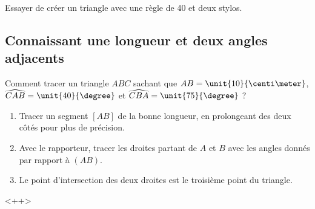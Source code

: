 \begin{example}
    Essayer de créer un triangle avec une règle de \unit{40}{\centi\meter} et deux stylos.
\end{example}

\subsection{Connaissant une longueur et deux angles adjacents}



\vspace{2cm}

Comment tracer un triangle \( ABC\) sachant que \( AB=\unit{10}{\centi\meter}\), \( \widehat{CAB}=\unit{40}{\degree}\) et \( \widehat{CBA}=\unit{75}{\degree}\) ?



\begin{enumerate}
    \item
        Tracer un segment $[AB]$ de la bonne longueur, en prolongeant des deux côtés pour plus de précision.

\begin{center}
   
\end{center}
\item
    Avec le rapporteur, tracer les droites partant de \( A\) et \( B\) avec les angles donnés par rapport à \( (AB)\).

\begin{center}
   
\end{center}

\item

    Le point d'intersection des deux droites est le troisième point du triangle.

\begin{center}
   
\end{center}



\end{enumerate}
<++>

